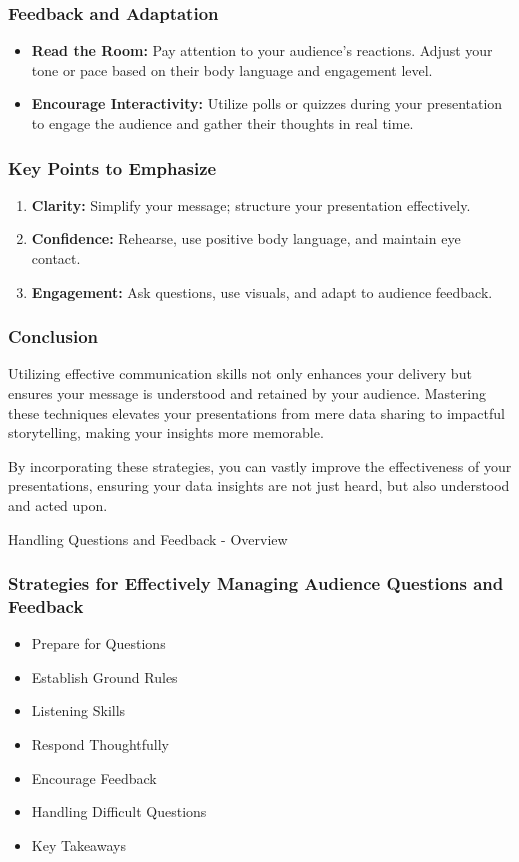 \documentclass[aspectratio=169]{beamer}
\begin{document}
\begin{frame}[fragile]
    \frametitle{Feedback and Adaptation}
    \begin{itemize}
        \item \textbf{Read the Room:} Pay attention to your audience’s reactions. Adjust your tone or pace based on their body language and engagement level.
        \item \textbf{Encourage Interactivity:} Utilize polls or quizzes during your presentation to engage the audience and gather their thoughts in real time.
    \end{itemize}
\end{frame}

\begin{frame}[fragile]
    \frametitle{Key Points to Emphasize}
    \begin{enumerate}
        \item \textbf{Clarity:} Simplify your message; structure your presentation effectively.
        \item \textbf{Confidence:} Rehearse, use positive body language, and maintain eye contact.
        \item \textbf{Engagement:} Ask questions, use visuals, and adapt to audience feedback.
    \end{enumerate}
\end{frame}

\begin{frame}[fragile]
    \frametitle{Conclusion}
    Utilizing effective communication skills not only enhances your delivery but ensures your message is understood and retained by your audience. Mastering these techniques elevates your presentations from mere data sharing to impactful storytelling, making your insights more memorable.
    
    By incorporating these strategies, you can vastly improve the effectiveness of your presentations, ensuring your data insights are not just heard, but also understood and acted upon.
\end{frame}

\begin{frame}[fragile]{Handling Questions and Feedback - Overview}
    \frametitle{Strategies for Effectively Managing Audience Questions and Feedback}
    
    \begin{itemize}
        \item Prepare for Questions
        \item Establish Ground Rules
        \item Listening Skills
        \item Respond Thoughtfully
        \item Encourage Feedback
        \item Handling Difficult Questions
        \item Key Takeaways
    \end{itemize}
\end{frame}
\end{document}
